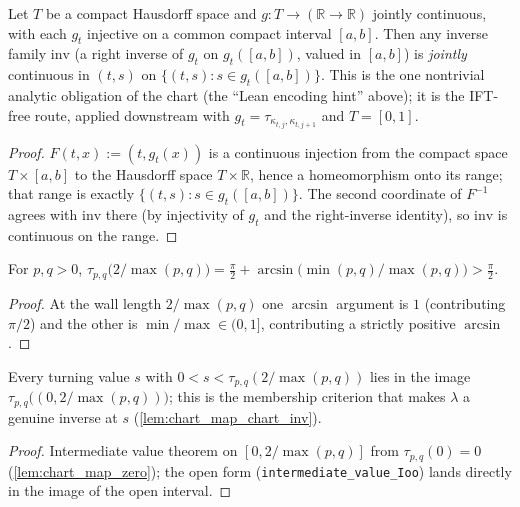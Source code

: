 \begin{lemma}
  \label{lem:continuous_inv_family}
  Let $T$ be a compact Hausdorff space and $g : T \to (\mathbb{R} \to
  \mathbb{R})$ jointly continuous, with each $g_t$ injective on a common compact
  interval $[a,b]$. Then any inverse family $\mathrm{inv}$ (a right inverse of
  $g_t$ on $g_t([a,b])$, valued in $[a,b]$) is \emph{jointly} continuous in
  $(t,s)$ on $\{(t,s) : s \in g_t([a,b])\}$. This is the one nontrivial
  analytic obligation of the chart (the ``Lean encoding hint'' above); it is
  the IFT-free route, applied downstream with $g_t = \tau_{\kappa_{t,j},
  \kappa_{t,j+1}}$ and $T = [0,1]$.
\end{lemma}
\begin{proof}

\leanok
  $F(t,x) := (t, g_t(x))$ is a continuous injection from the compact space
  $T \times [a,b]$ to the Hausdorff space $T \times \mathbb{R}$, hence a
  homeomorphism onto its range; that range is exactly
  $\{(t,s) : s \in g_t([a,b])\}$. The second coordinate of $F^{-1}$ agrees with
  $\mathrm{inv}$ there (by injectivity of $g_t$ and the right-inverse
  identity), so $\mathrm{inv}$ is continuous on the range.
\end{proof}

\begin{lemma}
  \label{lem:chart_wall}
  For $p, q > 0$,
  $\tau_{p,q}\bigl(2/\max(p,q)\bigr) = \tfrac\pi2 +
  \arcsin\bigl(\min(p,q)/\max(p,q)\bigr) > \tfrac\pi2$.
\end{lemma}
\begin{proof}

\leanok
  At the wall length $2/\max(p,q)$ one $\arcsin$ argument is $1$ (contributing
  $\pi/2$) and the other is $\min/\max \in (0,1]$, contributing a strictly
  positive $\arcsin$.
\end{proof}

\begin{lemma}
  \label{lem:chart_mem_image}
  Every turning value $s$ with $0 < s < \tau_{p,q}(2/\max(p,q))$ lies in the
  image $\tau_{p,q}\bigl((0, 2/\max(p,q))\bigr)$; this is the membership
  criterion that makes $\lambda$ a genuine inverse at $s$
  (\cref{lem:chart_map_chart_inv}).
\end{lemma}
\begin{proof}

\leanok
  Intermediate value theorem on $[0, 2/\max(p,q)]$ from
  $\tau_{p,q}(0) = 0$ (\cref{lem:chart_map_zero}); the open form
  (\texttt{intermediate\_value\_Ioo}) lands directly in the image of the open
  interval.
\end{proof}

